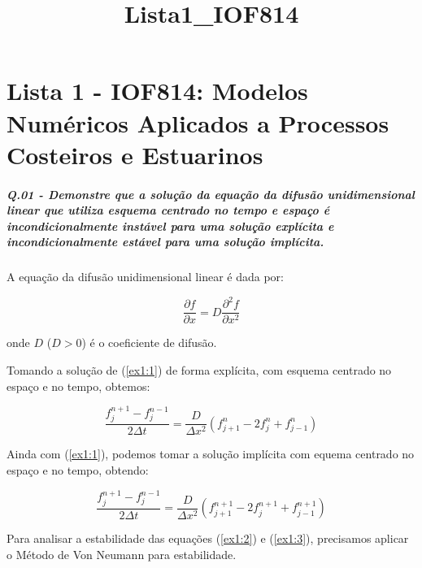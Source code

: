 \documentclass[11pt]{article}
\title{Lista1\_IOF814}
\begin{document}
    \maketitle




    \section{Lista 1 - IOF814: Modelos Numéricos Aplicados a Processos
Costeiros e
Estuarinos}\label{lista-1---iof814-modelos-numuxe9ricos-aplicados-a-processos-costeiros-e-estuarinos}

    \subparagraph{Q.01 - Demonstre que a solução da equação da difusão
unidimensional linear que utiliza esquema centrado no tempo e espaço é
incondicionalmente instável para uma solução explícita e
incondicionalmente estável para uma solução
implícita.}\label{q.01---demonstre-que-a-soluuxe7uxe3o-da-equauxe7uxe3o-da-difusuxe3o-unidimensional-linear-que-utiliza-esquema-centrado-no-tempo-e-espauxe7o-uxe9-incondicionalmente-instuxe1vel-para-uma-soluuxe7uxe3o-expluxedcita-e-incondicionalmente-estuxe1vel-para-uma-soluuxe7uxe3o-impluxedcita.}

A equação da difusão unidimensional linear é dada por:

\begin{equation}
\frac{\partial{f}}{\partial{x}} = D\frac{\partial^2{f}}{\partial{x^2}}
\label{ex1:1}
\end{equation}

onde \(D\) (\(D > 0\)) é o coeficiente de difusão.

Tomando a solução de (\ref{ex1:1}) de forma explícita, com esquema
centrado no espaço e no tempo, obtemos:

\begin{equation}
\frac{f^{n+1}_{j} - f^{n-1}_{j}}{2\Delta{t}} = \frac{D}{\Delta{x^2}}(f^{n}_{j+1} - 2f^{n}_{j} + f^{n}_{j-1})
\label{ex1:2}
\end{equation}

Ainda com (\ref{ex1:1}), podemos tomar a solução implícita com equema
centrado no espaço e no tempo, obtendo:

\begin{equation}
\frac{f^{n+1}_{j} - f^{n-1}_{j}}{2\Delta{t}} = \frac{D}{\Delta{x^2}}(f^{n+1}_{j+1} - 2f^{n+1}_{j} + f^{n+1}_{j-1})
\label{ex1:3}
\end{equation}

Para analisar a estabilidade das equações (\ref{ex1:2}) e (\ref{ex1:3}),
precisamos aplicar o Método de Von Neumann para estabilidade.
\end{document}

